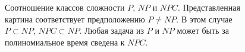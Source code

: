 \begin{figure}
\centering



\caption{Соотношение классов сложности $P$, $NP$ и $NPC$.
Представленная картина соответствует предположению $P \ne NP$. В этом
случае $P \subset NP$, $NPC \subset NP$. Любая задача из $P$ и $NP$
может быть за полиномиальное время сведена к $NPC$.
} 
\label{figAddAlgoPNP}
\end{figure}
